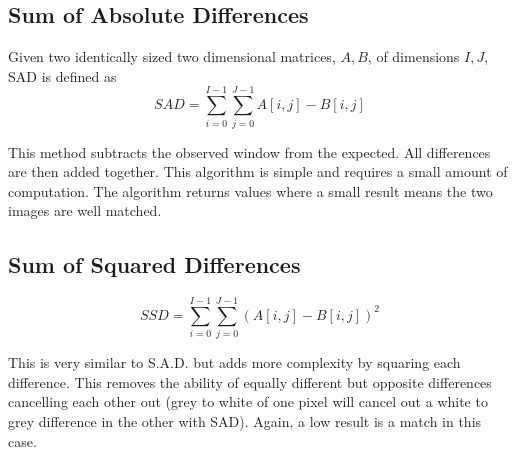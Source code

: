 \subsection{Sum of Absolute Differences}\label{Section:SAD}

Given two identically sized two dimensional matrices, $A, B$, of dimensions $I,J$, SAD is defined as
\begin{equation} \label{eq:SAD}
SAD = \sum\limits_{i=0}^{I-1} \sum\limits_{j=0}^{J-1} A[i,j] - B[i,j] 
\end{equation}

This method subtracts the observed window from the expected. All differences are then added together. This algorithm is simple and requires a small amount of computation. The algorithm returns values where a small result means the two images are well matched.

\subsection{Sum of Squared Differences}\label{Section:SSD}
\begin{equation}\label{eq:SSD}
SSD = \sum\limits_{i=0}^{I-1} \sum\limits_{j=0}^{J-1} (A[i,j] - B[i,j] )^2
\end{equation}

This is very similar to S.A.D. but adds more complexity by squaring each difference. This removes the ability of equally different but opposite differences cancelling each other out (grey to white of one pixel will cancel out a white to grey difference in the other with SAD). Again, a low result is a match in this case.

%

